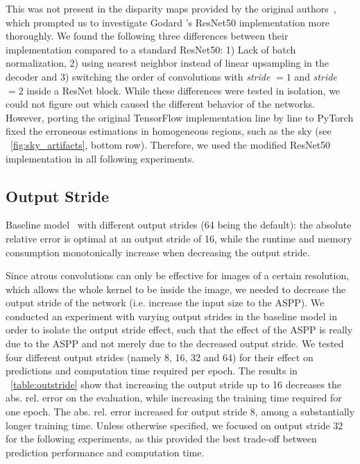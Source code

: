 This was not present in the disparity maps provided by the original authors~\cite{Godard_2017_CVPR}, which prompted us to investigate Godard \etal's ResNet50 implementation more thoroughly.
We found the following three differences between their implementation compared to a standard ResNet50: 
1) Lack of batch normalization,
2) using nearest neighbor instead of linear upsampling in the decoder and 
3) switching the order of convolutions with \textit{stride} $=1$ and \textit{stride} $= 2$ inside a ResNet block. 
While these differences were tested in isolation, we could not figure out which caused the different behavior of the networks.
However, porting the original TensorFlow implementation line by line to PyTorch fixed the erroneous estimations in homogeneous regions, such as the sky (see \figurename~\ref{fig:sky_artifacts}, bottom row).
Therefore, we used the modified ResNet50 implementation in all following experiments.

\subsection{Output Stride}
\label{section:experiments:output-stride}

\begin{table}


\caption{Baseline model~\cite{Godard_2017_CVPR} with different output strides (64 being the default): the absolute relative error is optimal at an output stride of 16, while the runtime and memory consumption monotonically increase when decreasing the output stride.}
\label{table:outstride}
\end{table}
Since atrous convolutions can only be effective for images of a certain resolution, which allows the whole kernel to be inside the image, we needed to decrease the output stride of the network (i.e. increase the input size to the ASPP). We conducted an experiment with varying output strides in the baseline model in order to isolate the output stride effect, such that the effect of the ASPP is really due to the ASPP and not merely due to the decreased output stride.
We tested four different output strides (namely 8, 16, 32 and 64) for their effect on predictions and computation time required per epoch.
The results in \tablename~\ref{table:outstride} show that increasing the output stride up to 16 decreases the abs. rel. error on the evaluation, while increasing the training time required for one epoch.
The abs. rel. error increased for output stride 8, among a substantially longer training time.
Unless otherwise specified, we focused on output stride 32 for the following experiments, as this provided the best trade-off between prediction performance and computation time. 

